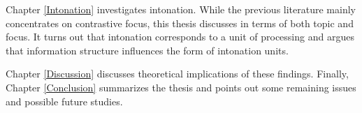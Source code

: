 \begin{refsection}
\newpage 
Chapter \ref{Intonation} investigates intonation.
While the previous literature mainly concentrates on contrastive focus,
this thesis discusses in terms of both topic and focus.
It turns out that intonation corresponds to a unit of processing and
argues that information structure influences the form of intonation units.

Chapter \ref{Discussion} discusses theoretical implications of these findings.
Finally, Chapter \ref{Conclusion} summarizes the thesis
and points out some remaining issues and possible future studies.

\end{refsection}
